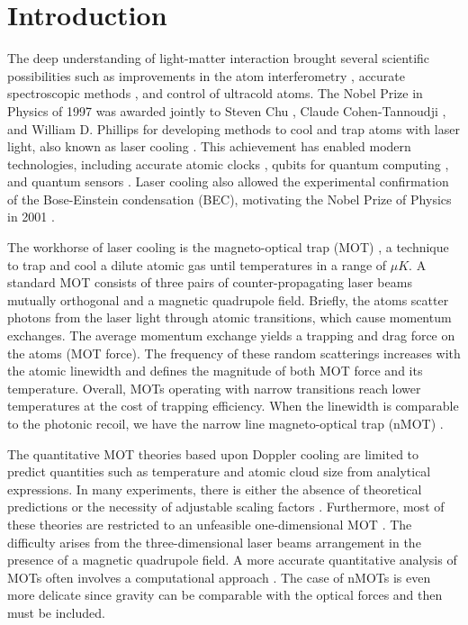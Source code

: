 %
%
\chapter{Introduction}
\label{ch:introduction}

The deep understanding of light-matter interaction brought several scientific possibilities such as improvements in the atom interferometry \cite{peters2001high}, accurate spectroscopic methods \cite{mukamel2020roadmap}, and control of ultracold atoms. 
The Nobel Prize in Physics of 1997 was awarded jointly to Steven Chu \cite{chu1998nobel}, Claude Cohen-Tannoudji \cite{cohen1998nobel}, and William D. Phillips \cite{phillips1998nobel} for developing methods to cool and trap atoms with laser light, also known as laser cooling \cite{metcalf2007laser}. This achievement has enabled modern technologies, including accurate atomic clocks \cite{ludlow2015optical}, qubits for quantum computing \cite{schneider2012quantum}, and quantum sensors \cite{zhang2016precision}. Laser cooling also allowed the experimental confirmation of the Bose-Einstein condensation (BEC), motivating the Nobel Prize of Physics in 2001 \cite{cornell2002nobel, ketterle2002nobel}.

The workhorse of laser cooling is the magneto-optical trap (MOT) \cite{krzysztof2010magneto}, a technique to trap and cool a dilute atomic gas until temperatures in a range of $\mu K$. A standard MOT consists of three pairs of counter-propagating laser beams mutually orthogonal and a magnetic quadrupole field. Briefly, the atoms scatter photons from the laser light through atomic transitions, which cause momentum exchanges. The average momentum exchange yields a trapping and drag force on the atoms (MOT force). The frequency of these random scatterings increases with the atomic linewidth and defines the magnitude of both MOT force and its temperature. Overall, MOTs operating with narrow transitions reach lower temperatures at the cost of trapping efficiency. When the linewidth is comparable to the photonic recoil, we have the narrow line magneto-optical trap (nMOT) \cite{frisch2012narrow, maier2014narrow, miyazawa2021narrow}.

The quantitative MOT theories based upon Doppler cooling are limited to predict quantities such as temperature \cite{lett1988observation} and atomic cloud size \cite{gattobigio2010scaling} from analytical expressions. In many experiments, there is either the absence of theoretical predictions or the necessity of adjustable scaling factors \cite{loo2003investigations}. Furthermore, most of these theories are restricted to an unfeasible one-dimensional MOT \cite{metcalf2007laser, balykin2000electromagnetic}. The difficulty arises from the three-dimensional laser beams arrangement in the presence of a magnetic quadrupole field. A more accurate quantitative analysis of MOTs often involves a computational approach \cite{chaudhuri2006realization, atutov2001sodium,hanley2018quantitative}. The case of nMOTs is even more delicate since gravity can be comparable with the optical forces and then must be included.

